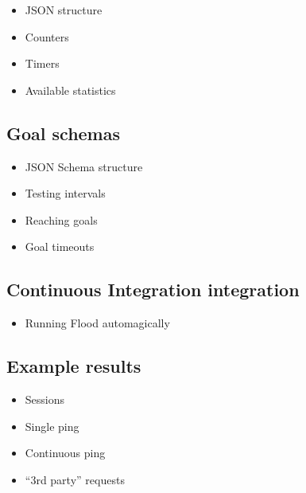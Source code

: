 \documentclass[a4paper]{article}
\begin{document}
\begin{itemize}
\item JSON structure
\item Counters
\item Timers
\item Available statistics
\end{itemize}
\subsection{Goal schemas}
\label{sec-4-2}
\label{ref-goal_schemas}


\begin{itemize}
\item JSON Schema structure
\item Testing intervals
\item Reaching goals
\item Goal timeouts
\end{itemize}
\subsection{Continuous Integration integration}
\label{sec-4-3}


\begin{itemize}
\item Running Flood automagically
\end{itemize}
\subsection{Example results}
\label{sec-4-4}
\label{ref-example_results}



\begin{itemize}
\item Sessions
\item Single ping
\item Continuous ping
\item ``3rd party'' requests
\end{itemize}
\end{document}
